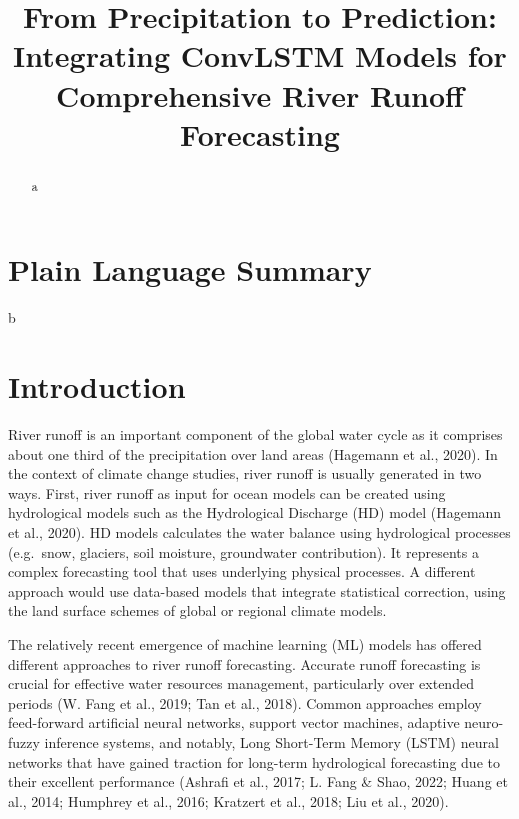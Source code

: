 \documentclass[
]{agujournal2019}
\begin{document}
\title{From Precipitation to Prediction: Integrating ConvLSTM Models for
Comprehensive River Runoff Forecasting}



\begin{abstract}
a
\end{abstract}

\section*{Plain Language Summary}
b



\section{Introduction}\label{introduction}

River runoff is an important component of the global water cycle as it
comprises about one third of the precipitation over land areas (Hagemann
et al., 2020). In the context of climate change studies, river runoff is
usually generated in two ways. First, river runoff as input for ocean
models can be created using hydrological models such as the Hydrological
Discharge (HD) model (Hagemann et al., 2020). HD models calculates the
water balance using hydrological processes (e.g.~snow, glaciers, soil
moisture, groundwater contribution). It represents a complex forecasting
tool that uses underlying physical processes. A different approach would
use data-based models that integrate statistical correction, using the
land surface schemes of global or regional climate models.

The relatively recent emergence of machine learning (ML) models has
offered different approaches to river runoff forecasting. Accurate
runoff forecasting is crucial for effective water resources management,
particularly over extended periods (W. Fang et al., 2019; Tan et al.,
2018). Common approaches employ feed-forward artificial neural networks,
support vector machines, adaptive neuro-fuzzy inference systems, and
notably, Long Short-Term Memory (LSTM) neural networks that have gained
traction for long-term hydrological forecasting due to their excellent
performance (Ashrafi et al., 2017; L. Fang \& Shao, 2022; Huang et al.,
2014; Humphrey et al., 2016; Kratzert et al., 2018; Liu et al., 2020).
\end{document}

